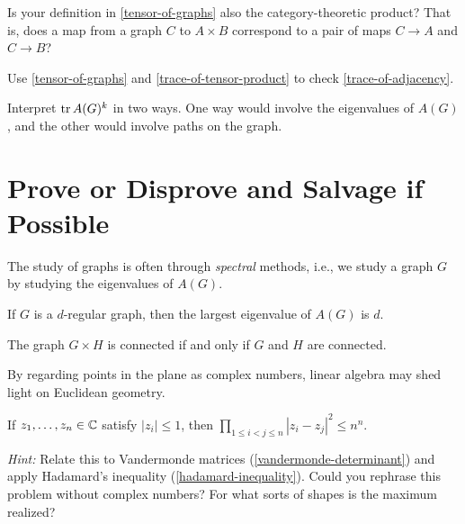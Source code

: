 \documentclass{homework}
\begin{document}
\begin{problem}
  Is your definition in \ref{tensor-of-graphs} also the
  category-theoretic product?  That is, does a map from a graph
  $C$ to $A \times B$ correspond to a pair of maps $C \to A$ and
  $C \to B$?
\end{problem}

\vspace{-2ex}\begin{problem}
  Use \ref{tensor-of-graphs} and \ref{trace-of-tensor-product} to
  check \ref{trace-of-adjacency}.
\end{problem}

\begin{problem}Interpret $\operatorname{tr} A(G)^k$ in two ways.  One way would involve the eigenvalues
  of $A(G)$, and the other would involve paths on the graph.
\end{problem}

\section{Prove or Disprove and Salvage if Possible}

\begin{problem}
  The study of graphs is often through \textit{spectral} methods,
  i.e., we study a graph $G$ by studying the eigenvalues of $A(G)$.

  If $G$ is a $d$-regular graph, then the largest eigenvalue of $A(G)$ is $d$.
\end{problem}

\begin{problem}%
  The graph $G \times H$ is connected if and only if $G$ and $H$ are connected.
\end{problem}

\begin{problem}
  By regarding points in the plane as complex numbers, linear algebra may shed light on Euclidean geometry.
  
  If $z_1, \ldots, z_n \in \mathbb{C}$ satisfy $|z_i| \leq 1$, then
  \(
    \displaystyle\prod_{1 \leq i < j \leq n} |z_i - z_j|^2 \leq n^n
    \).
    
    \textit{Hint:} Relate this to Vandermonde matrices
    (\ref{vandermonde-determinant}) and apply Hadamard's inequality
    (\ref{hadamard-inequality}).  Could you rephrase this problem
    without complex numbers?  For what sorts of shapes is the maximum
    realized? %
\end{problem}
\end{document}
